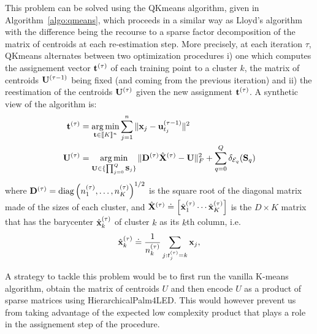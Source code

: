 This problem can be solved using the QKmeans algorithm, given in Algorithm~\ref{algo:qmeans},
which proceeds in a similar way as Lloyd's algorithm with the difference being the 
recourse to a sparse factor decomposition of the matrix of centroids at
each re-estimation step. More precisely, at each iteration $\tau$, 
QKmeans alternates between two 
optimization procedures i) one which computes the assignement vector ${\mathbf{t}}^{(\tau)}$ 
of each training point to a cluster $k$, the matrix of centroids ${\mathbf{U}}^{(\tau-1)}$ being
fixed (and coming from the previous iteration) and ii) the reestimation of the centroids
 ${\mathbf{U}}^{(\tau)}$ given the new assignment ${\mathbf{t}}^{(\tau)}$. A synthetic view of the algorithm
 is:
\begin{subequations}
\label{eq:qmeans}
\begin{align}
{\mathbf{t}}^{(\tau)} &= \operatorname*{arg\,min}_{{\mathbf{t}}\in\llbracket K\rrbracket^n}\sum_{j=1}^n\|{\mathbf{x}}_j-{\mathbf{u}}_{t_j}^{(\tau-1)}\|^2\label{eq:assignment}\\
{\mathbf{U}}^{(\tau)} &= \operatorname*{arg\,min}_{{\mathbf{U}}\in\{\prod_{j=0}^Q{\mathbf{S}}_j\}}\|{\mathbf{D}}^{(\tau)}\hat{{\mathbf{X}}}^{(\tau)}-{\mathbf{U}}\|_F^2+\sum_{q=0}^{Q} \delta_{\mathcal{E}_q}({\mathbf{S}}_q)\label{eq:reestimation}
\end{align}
\end{subequations}
where ${\mathbf{D}}^{(\tau)}=\text{diag}\left({n_1^{(\tau)}},\ldots,{n_K^{(\tau)}}\right)^{1/2}$ is the square
root of the diagonal matrix made of the sizes of each cluster, and $\hat{{\mathbf{X}}}^{(\tau)}\doteq \left[\hat{{\mathbf{x}}}^{(\tau)}_1\cdots\hat{{\mathbf{x}}}^{(\tau)}_K\right]$
is the $D\times K$ matrix that has the barycenter $\hat{{\mathbf{x}}}^{(\tau)}_k$ of cluster $k$ as
its $k$th column, i.e.
\begin{align}
	\hat{{\mathbf{x}}}^{(\tau)}_k \doteq \frac{1}{n_k^{(\tau)}}\sum_{j:t_j^{(\tau)}=k}{\mathbf{x}}_j,
\end{align}





\begin{remark}
A strategy to tackle this problem would be to first run the vanilla K-means algorithm,
 obtain the matrix of centroids $U$ and then encode $U$ as a product of sparse matrices
 using HierarchicalPalm4LED. This would however prevent us from taking advantage of 
 the expected low complexity product that plays a role in the assignement step of 
 the procedure.
\end{remark}

